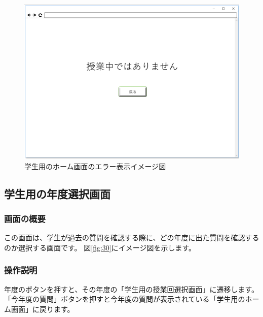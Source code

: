 \begin{figure}[htbp]
  \begin{center}
    \includegraphics[width=0.5\linewidth,clip]{./img/00.png}
    \caption{学生用のホーム画面のエラー表示イメージ図}\label{fig:00}
  \end{center}
\end{figure}

\newpage

\subsection{学生用の年度選択画面}
\subsubsection{画面の概要}
この画面は、学生が過去の質問を確認する際に、どの年度に出た質問を確認するのか選択する画面です。
図\ref{fig:30}にイメージ図を示します。

\subsubsection{操作説明}
年度のボタンを押すと、その年度の「学生用の授業回選択画面」に遷移します。
「今年度の質問」ボタンを押すと今年度の質問が表示されている「学生用のホーム画面」に戻ります。



